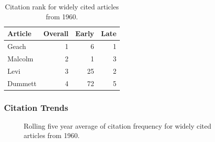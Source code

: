 \documentclass[
  10pt,
  letterpaper,
  DIV=11,
  numbers=noendperiod,
  twoside]{scrartcl}
\begin{document}
\begin{longtable}[]{@{}lrrr@{}}

\caption{\label{tbl-citation-rank-1960}Citation rank for widely cited
articles from 1960.}

\tabularnewline

\toprule\noalign{}
Article & Overall & Early & Late \\
\midrule\noalign{}
\endhead
\bottomrule\noalign{}
\endlastfoot
Geach & 1 & 6 & 1 \\
Malcolm & 2 & 1 & 3 \\
Levi & 3 & 25 & 2 \\
Dummett & 4 & 72 & 5 \\

\end{longtable}

\subsubsection*{Citation Trends}\label{sec-trends-1960}

\begin{figure}


\caption{\label{fig-citation-spaghetti-1960}Rolling five year average of
citation frequency for widely cited articles from 1960.}

\end{figure}%
\end{document}
